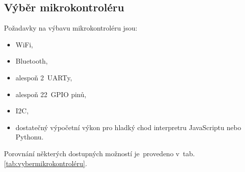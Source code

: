 \subsection{Výběr mikrokontroléru \label{subs:vybermikrokontroléru}}
Požadavky na výbavu mikrokontroléru jsou:
\begin{itemize}
    \item WiFi,
    \item Bluetooth,
    \item alespoň 2~UARTy,
    \item alespoň 22~GPIO pinů,
    \item I2C,
    \item dostatečný výpočetní výkon pro hladký chod interpretru JavaScriptu nebo Pythonu.
\end{itemize}

Porovnání některých dostupných možností je~provedeno v~tab. \ref{tab:vybermikrokontroléru}.
